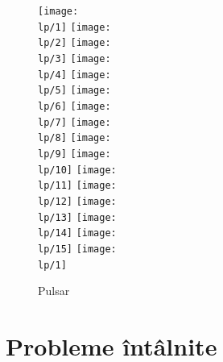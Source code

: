 \documentclass[11pt ,A4]{article}
\begin{document}
                    \begin{figure}[H]
                        \newcommand\lp{organisme/oscilante/5-pentadecathlon}
                        \centering
                        \texttt{[image: \\lp/1]}
                        \texttt{[image: \\lp/2]}
                        \texttt{[image: \\lp/3]}
                        \texttt{[image: \\lp/4]}
                        \texttt{[image: \\lp/5]}
                        \texttt{[image: \\lp/6]}
                        \texttt{[image: \\lp/7]}
                        \texttt{[image: \\lp/8]}
                        \texttt{[image: \\lp/9]}
                        \texttt{[image: \\lp/10]}
                        \texttt{[image: \\lp/11]}
                        \texttt{[image: \\lp/12]}
                        \texttt{[image: \\lp/13]}
                        \texttt{[image: \\lp/14]}
                        \texttt{[image: \\lp/15]}
                        \texttt{[image: \\lp/1]}
                        
                        \caption{Pulsar}
                    \end{figure}

                


    \section{Probleme întâlnite}
\end{document}
